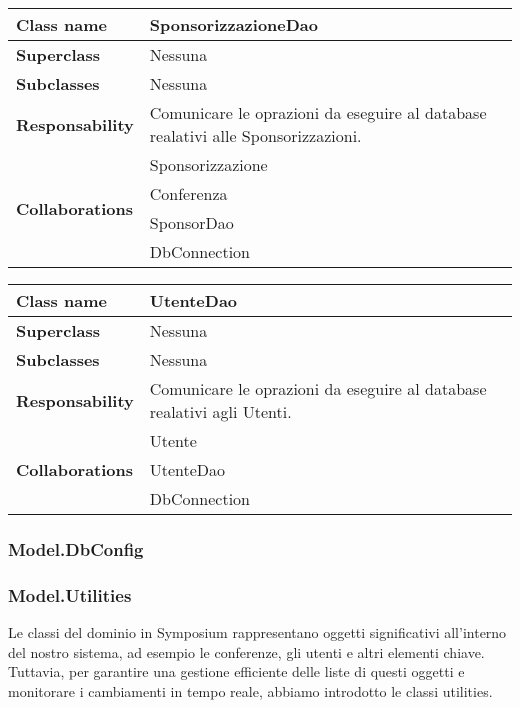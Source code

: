 \begin{table}[h!]
	\begin{tabular}{|l|l|}
		\hline 
		\textbf{Class name} & SponsorizzazioneDao
		\\ \hline
		\textbf{Superclass} & Nessuna
		\\ \hline
		\multirow{1}{*}{\textbf{Subclasses}} & Nessuna
		\\ \hline
		\textbf{Responsability} & Comunicare le oprazioni da eseguire al database realativi alle Sponsorizzazioni.
		\\ \hline
		\multirow{4}{*}{\textbf{Collaborations}} & Sponsorizzazione \\ 
		& Conferenza \\
		& SponsorDao \\
		& DbConnection \\ \hline
	\end{tabular}
\end{table}

\begin{table}[h!]
	\begin{tabular}{|l|l|}
		\hline 
		\textbf{Class name} & UtenteDao
		\\ \hline
		\textbf{Superclass} & Nessuna
		\\ \hline
		\multirow{1}{*}{\textbf{Subclasses}} & Nessuna
		\\ \hline
		\textbf{Responsability} & Comunicare le oprazioni da eseguire al database realativi agli Utenti.
		\\ \hline
		\multirow{3}{*}{\textbf{Collaborations}} & Utente \\ 
		& UtenteDao \\
		& DbConnection \\ \hline
	\end{tabular}
\end{table}

\subsubsection{Model.DbConfig}
\subsubsection{Model.Utilities}
Le classi del dominio in Symposium rappresentano oggetti significativi all'interno del nostro sistema, ad esempio le conferenze, gli utenti e altri elementi chiave. Tuttavia, per garantire una gestione efficiente delle liste di questi oggetti e monitorare i cambiamenti in tempo reale, abbiamo introdotto le classi utilities.
\bigskip

